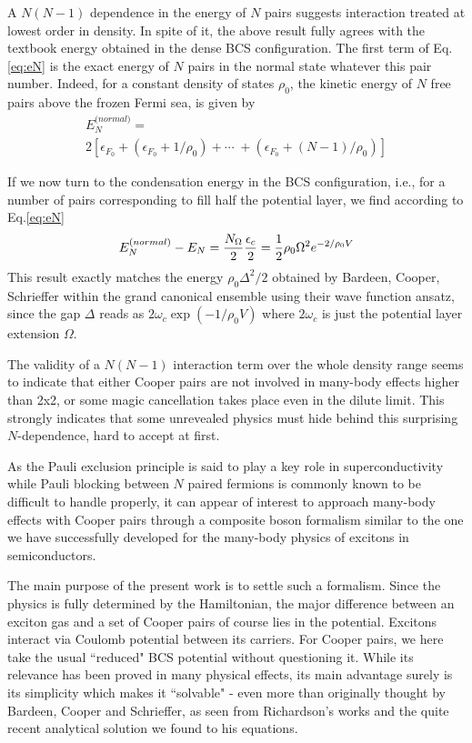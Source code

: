 \documentclass[aps,prb,superscriptaddress,showpacs,reprint,lengthcheck]{revtex4}
\begin{document}
A $N(N-1)$ dependence in the energy of $N$ pairs suggests interaction treated at lowest order in density. In spite of it, the above result fully agrees with the textbook energy obtained in the dense BCS configuration. The first term of Eq.\eqref{eq:eN} is
the exact energy of $N$ pairs in the normal state whatever this pair number. Indeed, for a constant density of states $\rho _{0}$, the kinetic energy of $N$ free pairs above the frozen Fermi sea, is given by
\begin{multline}
{E}_{N}^{\text{(}normal)}= \\
2\left[\epsilon _{F_{0}}+\left( \epsilon _{F_{0}}+1/\rho _{0}\right) +\cdots
\;+\left( \epsilon _{F_{0}}+(N-1)/\rho _{0}\right)\right]
\end{multline}%


If we now turn to the condensation energy in the BCS configuration, i.e., for a number of pairs corresponding to fill half the potential layer, we find  according to Eq.\eqref{eq:eN}  
\begin{equation}
{E}_{N}^{\text{(}normal)}-{E}_{N}=\frac{N_{\Omega }}{2}\frac{%
\epsilon _{c}}{2}=\frac{1}{2}\rho _{0}\Omega ^{2}e^{-2/\rho _{0}V}
\end{equation}%
This result exactly matches the energy  $\rho _{0}\Delta ^{2}/2$ obtained by Bardeen, Cooper, Schrieffer within the grand canonical
ensemble using their wave function ansatz, since the gap $\Delta $ reads as $%
2\omega _{c}\exp \left( -1/\rho _{0}V\right) $ where $2\omega _{c}$ is just the
potential layer extension $\Omega $. 

The validity of a $N(N-1)$ interaction term over the whole density range seems to indicate that either Cooper pairs are not involved in many-body effects higher than 2x2, or some magic cancellation takes place even in the dilute limit. This strongly indicates that some unrevealed physics must hide behind this surprising $N$-dependence, hard to accept at first. 

As the Pauli exclusion principle is said to play a key role in superconductivity while Pauli blocking between $N$ paired fermions is commonly known to be difficult to handle properly, it can appear of interest to approach many-body effects with Cooper pairs through a composite boson formalism similar to the one we have successfully developed for the many-body physics of excitons in semiconductors\cite
{CobosonPhysicsReports}.

The main purpose of the present work is to settle such a formalism. Since the physics is fully determined by the Hamiltonian, the major difference between an exciton gas and a set of Cooper pairs of course lies in the potential. Excitons interact via Coulomb potential between its carriers. For Cooper pairs, we here take the usual ``reduced" BCS potential without questioning it. While its relevance has been proved in many physical effects, its main advantage surely is its simplicity which makes it ``solvable" - even more than originally thought by Bardeen, Cooper and Schrieffer, as seen from Richardson's works and the quite recent analytical solution we found to his equations.
 
\end{document}
